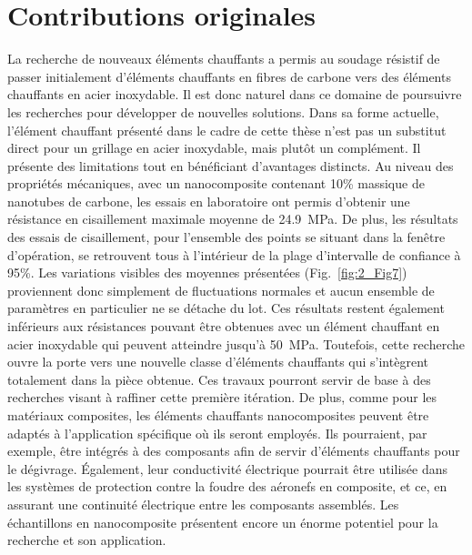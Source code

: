\label{sec:Contributions}

\section{Contributions originales}

La recherche de nouveaux éléments chauffants a permis au soudage résistif de passer initialement d'éléments chauffants en fibres de carbone vers des éléments chauffants en acier inoxydable. 
Il est donc naturel dans ce domaine de poursuivre les recherches pour développer de nouvelles solutions. 
Dans sa forme actuelle, l'élément chauffant présenté dans le cadre de cette thèse n'est pas un substitut direct pour un grillage en acier inoxydable, mais plutôt un complément. 
Il présente des limitations tout en bénéficiant d'avantages distincts.
Au niveau des propriétés mécaniques, avec un nanocomposite contenant 10\% massique de nanotubes de carbone, les essais en laboratoire ont permis d'obtenir une résistance en cisaillement maximale moyenne de \SI{24.9}{\mega\pascal}. 
De plus, les résultats des essais de cisaillement, pour l'ensemble des points se situant dans la fenêtre d'opération, se retrouvent tous à l'intérieur de la plage d'intervalle de confiance à 95\%. 
Les variations visibles des moyennes présentées (Fig.~\ref{fig:2_Fig7}) proviennent donc simplement de fluctuations normales et aucun ensemble de paramètres en particulier ne se détache du lot. 
Ces résultats restent également inférieurs aux résistances pouvant être obtenues avec un élément chauffant en acier inoxydable qui peuvent atteindre jusqu'à \SI{50}{\mega\pascal}. 
Toutefois, cette recherche ouvre la porte vers une nouvelle classe d'éléments chauffants qui s'intègrent totalement dans la pièce obtenue. 
Ces travaux pourront servir de base à des recherches visant à raffiner cette première itération. 
De plus, comme pour les matériaux composites, les éléments chauffants nanocomposites peuvent être adaptés à l'application spécifique où ils seront employés. 
Ils pourraient, par exemple, être intégrés à des composants afin de servir d'éléments chauffants pour le dégivrage. 
Également, leur conductivité électrique pourrait être utilisée dans les systèmes de protection contre la foudre des aéronefs en composite, et ce, en assurant une continuité électrique entre les composants assemblés. 
Les échantillons en nanocomposite présentent encore un énorme potentiel pour la recherche et son application. 

